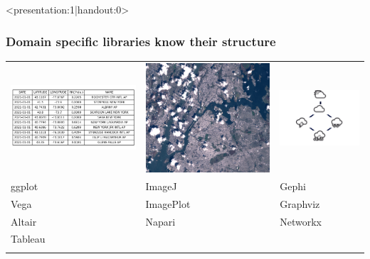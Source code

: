 \documentclass[xcolor={dvipsnames}]{beamer}
\begin{document}
\begin{frame}<presentation:1|handout:0>
    \frametitle{Domain specific libraries know their structure\cite{HeerSoftware2006}}
    \begin{table}
        \begin{tabular}{>{\onslide<1->}l>{\onslide<2->}l>{\onslide<3->}l}
            \includegraphics[width=.24\textwidth]{figures/intro/table.png} & \includegraphics[width=.3\textwidth]{figures/intro/landsat.png} & \includegraphics[width=.33\textwidth]{figures/math/graph.png} \\
            ggplot\cite{wickhamGgplot2ElegantGraphics2016a}  & ImageJ\cite{schneiderNIHImageImageJ2012}& Gephi\cite{bastianGephiOpenSource2009}\\
            Vega\cite{satyanarayanDeclarativeInteractionDesign2014} & ImagePlot\cite{studiesCulturevisImageplot2021} & Graphviz\cite{ellsonGraphvizOpenSource2002}\\
            Altair\cite{vanderplasAltairInteractiveStatistical2018}& Napari\cite{nicholas_sofroniew_2021_4533308} & Networkx\cite{HagbergExploringNetwork2008}\\
             Tableau \cite{StoltePolaris2002}& &\\
            \cite{hanrahanVizQL2006,MackinlayShowme2007}&&\\        
        \end{tabular}
    \end{table}
\end{frame}
\end{document}
